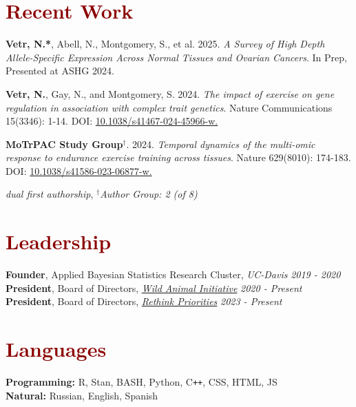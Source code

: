 \documentclass[11pt,margin,line]{resume}
\begin{document}
\begin{resume}
\section{\large\textcolor{DarkRed}{Recent Work}}

\textbf{Vetr, N.*}, Abell, N., Montgomery, S., et al.  2025.  \emph{A Survey of High Depth Allele-Specific Expression Across Normal Tissues and Ovarian Cancers}.  In Prep, Presented at ASHG 2024.

\textbf{Vetr, N.},  Gay,  N.,  and Montgomery,  S.  2024.  \emph{The impact of exercise on gene regulation in association with complex trait genetics}.  Nature Communications 15(3346): 1-14. DOI: \href{https://doi.org/10.1038/s41467-024-45966-w}{\color{blue}10.1038/s41467-024-45966-w.}

\textbf{MoTrPAC Study Group}$^{\dag}$. 2024.  \emph{Temporal dynamics of the multi-omic response to endurance exercise training across tissues}.  Nature 629(8010): 174-183. DOI: \href{https://doi.org/10.1038/s41586-023-06877-w}{\color{blue}10.1038/s41586-023-06877-w.}

\vspace{-1.5mm}
{\hfill\small*\textit{dual first authorship}, $^{\dag}$\textit{Author Group: 2 (of 8)}}

\vspace{-1.5mm}
\section{\large\textcolor{DarkRed}{Leadership}}
\textbf{Founder}, Applied Bayesian Statistics Research Cluster, \textit{UC-Davis} \hfill \emph{2019 - 2020}\\
\textbf{President}, Board of Directors, \textit{\href{https://www.wildanimalinitiative.org/}{Wild Animal Initiative}} \hfill \emph{2020 - Present}\\
\textbf{President}, Board of Directors, \textit{\href{https://rethinkpriorities.org/}{Rethink Priorities}} \hfill \emph{2023 - Present}\\

\vspace{-5mm}
\section{\large\textcolor{DarkRed}{Languages}}
\textbf{Programming:} R, Stan, BASH, Python, C\texttt{\texttt{+}\texttt{+}}, CSS, HTML, JS\\
\textbf{Natural:} Russian, English, Spanish


\end{resume}
\end{document}
